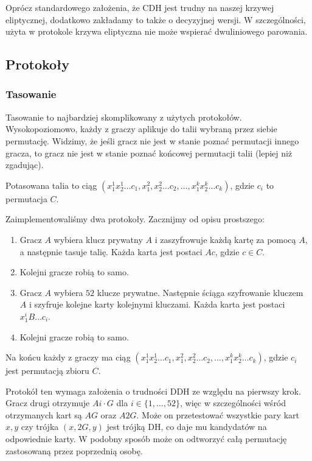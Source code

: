 \documentclass{article}
\begin{document}
Oprócz standardowego założenia, że CDH jest trudny na naszej krzywej eliptycznej, dodatkowo zakładamy to także o decyzyjnej wersji. W szczególności, użyta w protokole krzywa eliptyczna nie może wspierać dwuliniowego parowania.

\subsection{Protokoły}
\subsubsection{Tasowanie}

Tasowanie to najbardziej skomplikowany z użytych protokołów. Wysokopoziomowo, każdy z graczy aplikuje do talii wybraną przez siebie permutację. Widzimy, że jeśli gracz nie jest w stanie poznać permutacji innego gracza, to gracz nie jest w stanie poznać końcowej permutacji talii (lepiej niż zgadując).


Potasowana talia to ciąg $(x_1^1x_2^1\ldots c_1, x_1^2,x_2^2\ldots c_2, \ldots, x_1^kx_2^k\ldots c_k)$, gdzie $c_i$ to permutacja $C$.

Zaimplementowaliśmy dwa protokoły. Zacznijmy od opisu prostszego:

\begin{enumerate}
    \item Gracz $A$ wybiera klucz prywatny $A$ i zaszyfrowuje każdą kartę za pomocą $A$, a następnie tasuje talię. Każda karta jest postaci $Ac$, gdzie $c \in C$.

    \item Kolejni gracze robią to samo.

    \item Gracz $A$ wybiera $52$ klucze prywatne. Następnie ściąga szyfrowanie kluczem $A$ i szyfruje kolejne karty kolejnymi kluczami. Każda karta jest postaci $x_1^iB\ldots c_i$.

    \item Kolejni gracze robią to samo.
\end{enumerate}

Na końcu każdy z graczy ma ciąg $(x_1^1x_2^1\ldots c_1, x_1^2,x_2^2\ldots c_2, \ldots, x_1^kx_2^k\ldots c_k)$, gdzie $c_i$ jest permutacją zbioru $C$.

Protokół ten wymaga założenia o trudności DDH ze względu na pierwszy krok. Gracz drugi otrzymuje $Ai\cdot G$ dla $i\in \{1,\ldots,52\}$, więc w szczególności wśród otrzymanych kart są $AG$ oraz $A2G$. Może on przetestować wszystkie pary kart $x,y$ czy trójka $(x,2G,y)$ jest trójką DH, co daje mu kandydatów na odpowiednie karty. W podobny sposób może on odtworzyć całą permutację zastosowaną przez poprzednią osobę.
\end{document}
